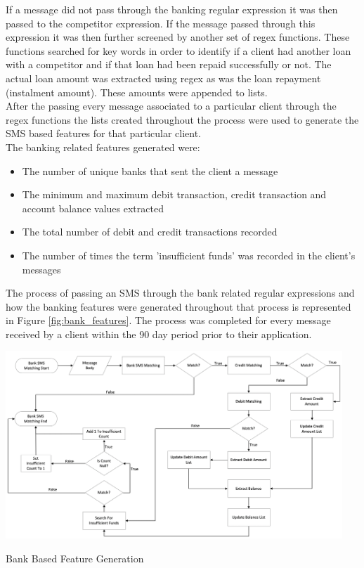 If a message did not pass through the banking regular expression it was then passed to the competitor expression. If the message passed through this expression it was then further screened by another set of regex functions. These functions searched for key words in order to identify if a client had another loan with a competitor and if that loan had been repaid successfully or not. The actual loan amount was extracted using regex as was the loan repayment (instalment amount). These amounts were appended to lists. \\

After the passing every message associated to a particular client through the regex functions the lists created throughout the process were used to generate the SMS based features for that particular client. \\

The banking related features generated were:

\begin{itemize}
    \item The number of unique banks that sent the client a message
    \item The minimum and maximum debit transaction, credit transaction and account balance values extracted
    \item The total number of debit and credit transactions recorded
    \item The number of times the term 'insufficient funds' was recorded in the client's messages
\end{itemize}

\vspace{15pt}

The process of passing an SMS through the bank related regular expressions and how the banking features were generated throughout that process is represented in Figure \ref{fig:bank_features}. The process was completed for every message received by a client within the 90 day period prior to their application. 

\vspace{15pt}

\begin{Figure}[!htb]
\centering
\includegraphics[width=0.95\textwidth]{images/bank_feats.png}
\caption{Bank Based Feature Generation}
\label{fig:bank_features}
\end{Figure}

